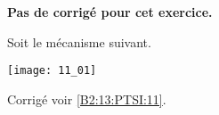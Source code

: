 \normaltrue \difficilefalse \tdifficilefalse
\correctionfalse


\setcounter{question}{0}
\ifcorrection
\else
\textbf{Pas de corrigé pour cet exercice.}
\fi

\ifprof
\else
Soit le mécanisme suivant. 
\begin{center}
\texttt{[image: 11\_01]}
\end{center}
\fi


\ifprof
\else
\fi



\ifprof
\else
\footnotesize
\ifcolle
\else

\fi
\normalsize
\begin{flushright}
\footnotesize{Corrigé  voir \ref{B2:13:PTSI:11}.}
\end{flushright}%
\fi